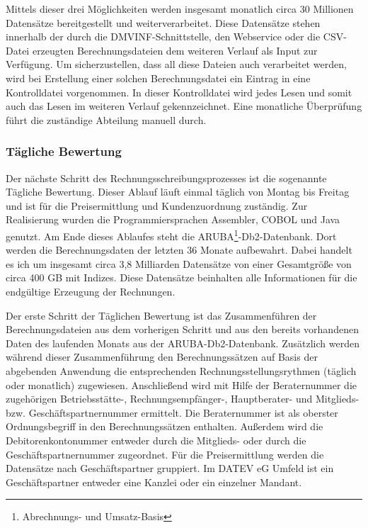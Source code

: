 Mittels dieser drei Möglichkeiten werden insgesamt monatlich circa 30 Millionen Datensätze bereitgestellt und weiterverarbeitet.
Diese Datensätze stehen innerhalb der durch die DMVINF-Schnittstelle, den Webservice oder die CSV-Datei erzeugten Berechnungsdateien dem weiteren Verlauf als Input zur Verfügung.
Um sicherzustellen, dass all diese Dateien auch verarbeitet werden, wird bei Erstellung einer solchen Berechnungsdatei ein Eintrag in eine Kontrolldatei vorgenommen.
In dieser Kontrolldatei wird jedes Lesen und somit auch das Lesen im weiteren Verlauf gekennzeichnet.
Eine monatliche Überprüfung führt die zuständige Abteilung manuell durch. 

\subsubsection{Tägliche Bewertung}\label{sssec:täglbew}
Der nächste Schritt des Rechnungsschreibungsprozesses ist die sogenannte \glqq Tägliche Bewertung\grqq.
Dieser Ablauf läuft einmal täglich von Montag bis Freitag und ist für die Preisermittlung und Kundenzuordnung zuständig.
Zur Realisierung wurden die Programmiersprachen Assembler, COBOL und Java genutzt.
Am Ende dieses Ablaufes steht die ARUBA\footnote{Abrechnungs- und Umsatz-Basis}-Db2-Datenbank.
Dort werden die Berechnungsdaten der letzten 36 Monate aufbewahrt.
Dabei handelt es ich um insgesamt circa 3,8 Milliarden Datensätze von einer Gesamtgröße von circa 400 GB mit Indizes.
Diese Datensätze beinhalten alle Informationen für die endgültige Erzeugung der Rechnungen.

Der erste Schritt der Täglichen Bewertung ist das Zusammenführen der Berechnungsdateien aus dem vorherigen Schritt und aus den bereits vorhandenen Daten des laufenden Monats aus der ARUBA-Db2-Datenbank.
Zusätzlich werden während dieser Zusammenführung den Berechnungssätzen auf Basis der abgebenden Anwendung die entsprechenden Rechnungsstellungsrythmen (täglich oder monatlich) zugewiesen.
Anschließend wird mit Hilfe der Beraternummer die zugehörigen Betriebsstätte-, Rechnungsempfänger-, Hauptberater- und Mitglieds- bzw. Geschäftspartnernummer ermittelt.
Die Beraternummer ist als oberster Ordnungsbegriff in den Berechnungssätzen enthalten.
Außerdem wird die Debitorenkontonummer entweder durch die Mitglieds- oder durch die Geschäftspartnernummer zugeordnet.
Für die Preisermittlung werden die Datensätze nach Geschäftspartner gruppiert.
Im DATEV eG Umfeld ist ein Geschäftspartner entweder eine Kanzlei oder ein einzelner Mandant.


